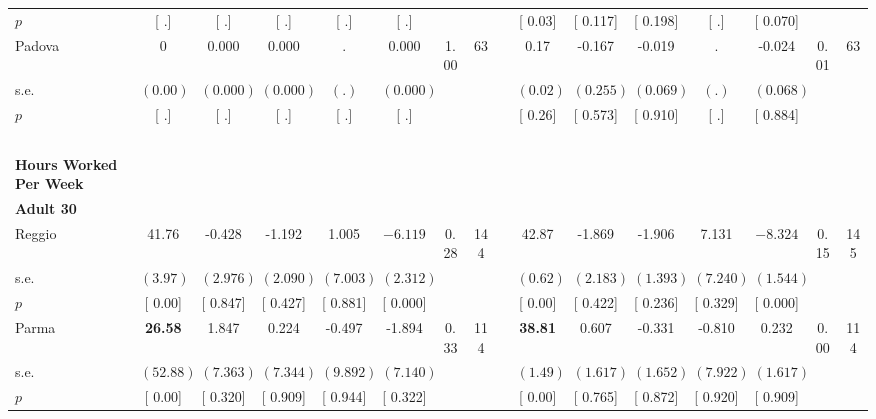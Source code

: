 \begin{longtable}{L{8em} c c c c c c c p{1em} c c c c c c c}
\quad \quad \quad \quad $ p$ & [        .] & [        .] & [        .] & [        .] & [        .] & & & & [     0.03] & [    0.117] & [    0.198] & [        .] & [    0.070] & &  \\[1em]
\quad \quad \quad Padova& 0 &     0.000 &     0.000 &         . &     0.000 &      1.00 &        63 & & 0.17 &    -0.167 &    -0.019 &         . &    -0.024 &      0.01 &        63  \\*
\quad \quad \quad \quad s.e.& $ (     0.00)$ & $ (    0.000)$ & $ (    0.000)$ & $ (        .)$ & $ (    0.000)$ & & & & $ (     0.02)$ & $ (    0.255)$ & $ (    0.069)$ & $ (        .)$ & $ (    0.068)$ & &  \\*
\quad \quad \quad \quad $ p$ & [        .] & [        .] & [        .] & [        .] & [        .] & & & & [     0.26] & [    0.573] & [    0.910] & [        .] & [    0.884] & &  \\[1em]
~\\[1em]
\textbf{Hours Worked Per Week} \\*
\quad \quad \textbf{Adult 30} & & & & & & & & & & & & & & & \\* 
\quad \quad \quad Reggio& 41.76 &    -0.428 &    -1.192 &     1.005 & $ \mathbf{   -6.119}$ &      0.28 &       144 & & 42.87 &    -1.869 &    -1.906 &     7.131 & $ \mathbf{   -8.324}$ &      0.15 &       145  \\*
\quad \quad \quad \quad s.e.& $ (     3.97)$ & $ (    2.976)$ & $ (    2.090)$ & $ (    7.003)$ & $ (    2.312)$ & & & & $ (     0.62)$ & $ (    2.183)$ & $ (    1.393)$ & $ (    7.240)$ & $ (    1.544)$ & &  \\*
\quad \quad \quad \quad $ p$ & [     0.00] & [    0.847] & [    0.427] & [    0.881] & [    0.000] & & & & [     0.00] & [    0.422] & [    0.236] & [    0.329] & [    0.000] & &  \\[1em]
\quad \quad \quad Parma& \textbf{    26.58} &     1.847 &     0.224 &    -0.497 &    -1.894 &      0.33 &       114 & & \textbf{    38.81} &     0.607 &    -0.331 &    -0.810 &     0.232 &      0.00 &       114  \\*
\quad \quad \quad \quad s.e.& $ (    52.88)$ & $ (    7.363)$ & $ (    7.344)$ & $ (    9.892)$ & $ (    7.140)$ & & & & $ (     1.49)$ & $ (    1.617)$ & $ (    1.652)$ & $ (    7.922)$ & $ (    1.617)$ & &  \\*
\quad \quad \quad \quad $ p$ & [     0.00] & [    0.320] & [    0.909] & [    0.944] & [    0.322] & & & & [     0.00] & [    0.765] & [    0.872] & [    0.920] & [    0.909] & &  \\[1em]

\end{longtable}
